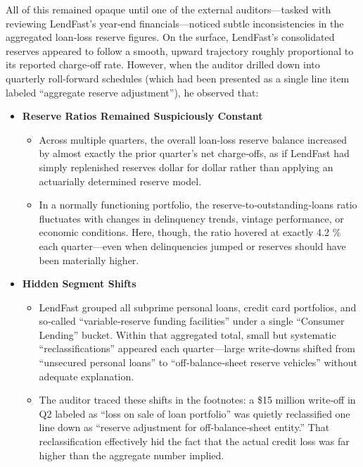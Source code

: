 All of this remained opaque until one of the external auditors—tasked with reviewing LendFast’s year‐end financials—noticed subtle inconsistencies in the aggregated loan‐loss reserve figures. On the surface, LendFast’s consolidated reserves appeared to follow a smooth, upward trajectory roughly proportional to its reported charge‐off rate. However, when the auditor drilled down into quarterly roll‐forward schedules (which had been presented as a single line item labeled “aggregate reserve adjustment”), he observed that:

\begin{itemize}[nosep]
    \item \textbf{Reserve Ratios Remained Suspiciously Constant}
    \begin{itemize}[nosep]
        \item Across multiple quarters, the overall loan‐loss reserve balance increased by almost exactly the prior quarter’s net charge‐offs, as if LendFast had simply replenished reserves dollar for dollar rather than applying an actuarially determined reserve model.
        \item In a normally functioning portfolio, the reserve‐to‐outstanding‐loans ratio fluctuates with changes in delinquency trends, vintage performance, or economic conditions. Here, though, the ratio hovered at exactly 4.2 \% each quarter—even when delinquencies jumped or reserves should have been materially higher.
    \end{itemize}

    \item \textbf{Hidden Segment Shifts}
    \begin{itemize}[nosep]
        \item LendFast grouped all subprime personal loans, credit card portfolios, and so‐called “variable‐reserve funding facilities” under a single “Consumer Lending” bucket. Within that aggregated total, small but systematic “reclassifications” appeared each quarter—large write‐downs shifted from “unsecured personal loans” to “off‐balance‐sheet reserve vehicles” without adequate explanation.
        \item The auditor traced these shifts in the footnotes: a \$15 million write‐off in Q2 labeled as “loss on sale of loan portfolio” was quietly reclassified one line down as “reserve adjustment for off‐balance‐sheet entity.” That reclassification effectively hid the fact that the actual credit loss was far higher than the aggregate number implied.
    \end{itemize}


\end{itemize}
